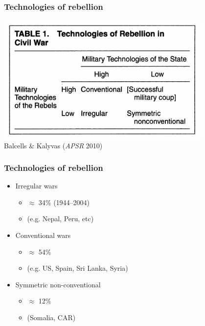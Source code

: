 \documentclass[utf8, xcolor=dvipsnames]{beamer}
\begin{document}
\begin{frame}
\frametitle{Technologies of rebellion}
\centering

\includegraphics[width = 0.8\textwidth]{img/kalyvas_balcells_tr}\\
{\small Balcells \& Kalyvas (\textit{APSR} 2010)}

\end{frame}

\begin{frame}
\frametitle{Technologies of rebellion}
\centering

\begin{itemize}
  \item Irregular wars
  \begin{itemize}
    \item[] $\approx$ 34\% (1944--2004)
    \item[] (e.g. Nepal, Peru, etc)
  \end{itemize}
  \item Conventional wars
  \begin{itemize}
    \item[] $\approx$ 54\%
    \item[] (e.g. US, Spain, Sri Lanka, Syria)
  \end{itemize}
  \item Symmetric non-conventional
  \begin{itemize}
    \item[] $\approx$ 12\%
    \item[] (Somalia, CAR)
  \end{itemize}
\end{itemize}

\end{frame}
\end{document}
